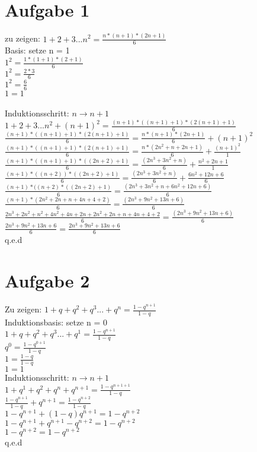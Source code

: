 \documentclass{article}
\begin{document}
	\section*{Aufgabe 1}
	zu zeigen: $1 + 2 + 3 ... n^2 = \frac{n * (n+1)*(2n+1)}{6}$ \\
	Basis: setze n = 1 \\
	$1^2 = \frac{1 * (1+1)*(2+1)}{6}$ \\
	$1^2 = \frac{2 * 3}{6}$ \\
	$1^2 = \frac{6}{6}$ \\
	$1 = 1$ \\ \\
	Induktionsschritt: $n \to n+1$ \\
	$1 + 2 + 3 ... n^2 + (n+1)^2 = \frac{(n+1) * ((n+1)+1)*(2(n+1)+1)}{6}$ \\
	$\frac{(n+1) * ((n+1)+1)*(2(n+1)+1)}{6} = \frac{n * (n+1)*(2n+1)}{6} + (n+1)^2$ \\
	$\frac{(n+1) * ((n+1)+1)*(2(n+1)+1)}{6}= \frac{n *(2n^2+n+2n+1)}{6} + \frac{(n+1)^2}{1}$ \\
	$\frac{(n+1) * ((n+1)+1)*((2n+2)+1)}{6}= \frac{(2n^3+3n^2+n)}{6} + \frac{n^2 + 2n + 1}{1}$ \\
	$\frac{(n+1) * ((n+2))*((2n+2)+1)}{6}= \frac{(2n^3+3n^2+n)}{6} + \frac{6n^2 + 12n + 6}{6}$ \\
	$\frac{(n+1) * ((n+2)*((2n+2)+1)}{6}= \frac{(2n^3+3n^2+n+6n^2 + 12n + 6)}{6}$ \\
	$\frac{(n+1) * (2n^2+2n+n+4n+4+2)}{6}= \frac{(2n^3+9n^2+13n + 6)}{6}$ \\
	$\frac{2n^3+2n^2+n^2+4n^2+4n+2n + 2n^2+2n+n+4n+4+2}{6}= \frac{(2n^3+9n^2+13n + 6)}{6}$ \\
	$\frac{2n^3+9n^2+13n+6}{6} = \frac{2n^3+9n^2+13n + 6}{6}$ \\
	q.e.d
	\section*{Aufgabe 2}
	Zu zeigen: $1+q+q^2+q^3...+q^n = \frac{1-q^{n+1}}{1 - q}$ \\
	Induktionsbasis: setze n = 0 \\
	$1+q+q^2+q^3...+q^1 = \frac{1-q^{n+1}}{1 - q}$ \\
	$q^0 =\frac{1-q^{0+1}}{1 - q} $ \\
	$1 =\frac{1-q}{1 - q} $ \\
	$1 = 1 $ \\
	Induktionsschritt: $n \to n+1$ \\
	$1 + q^1 + q^2 + q^n + q^{n+1} = \frac{1-q^{n+1+1}}{1-q}$ \\
	$\frac{1-q^{n+1}}{1-q} + q^{n+1} = \frac{1-q^{n+2}}{1-q}$ \\
	$1-q^{n+1} + (1-q)q^{n+1} = 1-q^{n+2}$ \\
	$1-q^{n+1} + q^{n+1}  - q^{n+2} = 1-q^{n+2} $ \\
	$1 - q^{n+2} = 1 - q^{n+2}$ \\
	q.e.d
\end{document}
